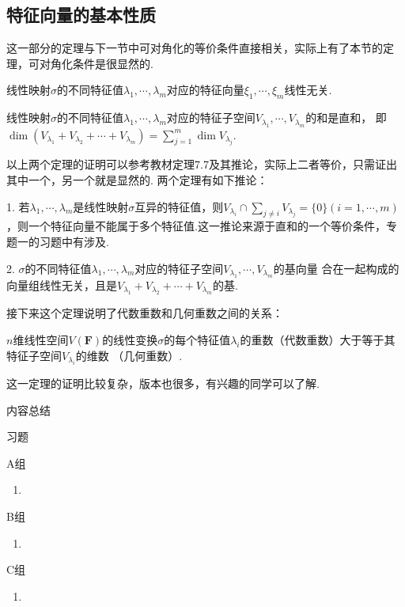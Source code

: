 \subsection{特征向量的基本性质}
这一部分的定理与下一节中可对角化的等价条件直接相关，实际上有了本节的定理，可对角化条件是很显然的.
\begin{theorem}
	线性映射$\sigma$的不同特征值$\lambda_1,\cdots,\lambda_m$对应的特征向量$\xi_1,\cdots,\xi_m$线性无关.
\end{theorem}
\begin{theorem}
	线性映射$\sigma$的不同特征值$\lambda_1,\cdots,\lambda_m$对应的特征子空间$V_{\lambda_1},\cdots,V_{\lambda_m}$的和是直和，
	即$\dim(V_{\lambda_1}+V_{\lambda_2}+\cdots+V_{\lambda_m})=\sum_{j=1}^{m}\dim V_{\lambda_j}$.
\end{theorem}
以上两个定理的证明可以参考教材定理7.7及其推论，实际上二者等价，只需证出其中一个，另一个就是显然的.
两个定理有如下推论：

1. 若$\lambda_1,\cdots,\lambda_m$是线性映射$\sigma$互异的特征值，则$V_{\lambda_i}\cap\sum\limits_{j\neq i}V_{\lambda_j}=\{0\}
(i=1,\cdots,m)$，则一个特征向量不能属于多个特征值.这一推论来源于直和的一个等价条件，专题一的习题中有涉及.

2. $\sigma$的不同特征值$\lambda_1,\cdots,\lambda_m$对应的特征子空间$V_{\lambda_1},\cdots,V_{\lambda_m}$的基向量
合在一起构成的向量组线性无关，且是$V_{\lambda_1}+V_{\lambda_2}+\cdots+V_{\lambda_m}$的基.

接下来这个定理说明了代数重数和几何重数之间的关系：
\begin{theorem}
	$n$维线性空间$V(\mathbf{F})$的线性变换$\sigma$的每个特征值$\lambda_i$的重数（代数重数）大于等于其特征子空间$V_{\lambda_i}$的维数
	（几何重数）.
\end{theorem}
这一定理的证明比较复杂，版本也很多，有兴趣的同学可以了解.

\vspace{2ex} 
\centerline{\heiti \Large 内容总结}

\vspace{2ex} 

\centerline{\heiti \Large 习题}
\vspace{2ex} 
{\kaishu }
\begin{flushright}
    \kaishu

\end{flushright}
\centerline{\heiti A组}
\begin{enumerate}
	\item 
\end{enumerate}
\centerline{\heiti B组}
\begin{enumerate}
	\item 
\end{enumerate}
\centerline{\heiti C组}
\begin{enumerate}
	\item 
\end{enumerate}